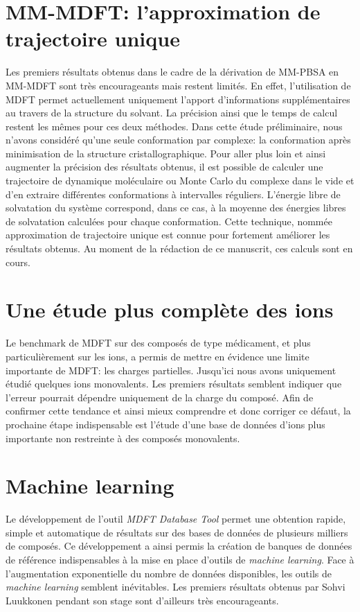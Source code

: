 \section{MM-MDFT: l'approximation de trajectoire unique}
Les premiers résultats obtenus dans le cadre de la dérivation de MM-PBSA en MM-MDFT sont très encourageants mais restent limités. En effet, l'utilisation de MDFT permet actuellement uniquement l'apport d'informations supplémentaires au travers de la structure du solvant. La précision ainsi que le temps de calcul restent les mêmes pour ces deux méthodes. Dans cette étude préliminaire, nous n'avons considéré qu'une seule conformation par complexe: la conformation après minimisation de la structure cristallographique. Pour aller plus loin et ainsi augmenter la précision des résultats obtenus, il est possible de calculer une trajectoire de dynamique moléculaire ou Monte Carlo du complexe dans le vide et d'en extraire différentes conformations à intervalles réguliers. L'énergie libre de solvatation du système correspond, dans ce cas, à la moyenne des énergies libres de solvatation calculées pour chaque conformation. Cette technique, nommée approximation de trajectoire unique est connue pour fortement améliorer les résultats obtenus. Au moment de la rédaction de ce manuscrit, ces calculs sont en cours.

\section{Une étude plus complète des ions}
Le benchmark de MDFT sur des composés de type médicament, et plus particulièrement sur les ions, a permis de mettre en évidence une limite importante de MDFT: les charges partielles. Jusqu'ici nous avons uniquement étudié quelques ions monovalents. Les premiers résultats semblent indiquer que l'erreur pourrait dépendre uniquement de la charge du composé. Afin de confirmer cette tendance et ainsi mieux comprendre et donc corriger ce défaut, la prochaine étape indispensable est l'étude d'une base de données d'ions plus importante non restreinte à des composés monovalents.

\section{Machine learning}
Le développement de l'outil \textit{MDFT Database Tool} permet une obtention rapide, simple et automatique de résultats sur des bases de données de plusieurs milliers de composés. Ce développement a ainsi permis la création de banques de données de référence indispensables à la mise en place d'outils de \textit{machine learning}. Face à l'augmentation exponentielle du nombre de données disponibles, les outils de \textit{machine learning} semblent inévitables. Les premiers résultats obtenus par Sohvi Luukkonen pendant son stage sont d'ailleurs très encourageants.

